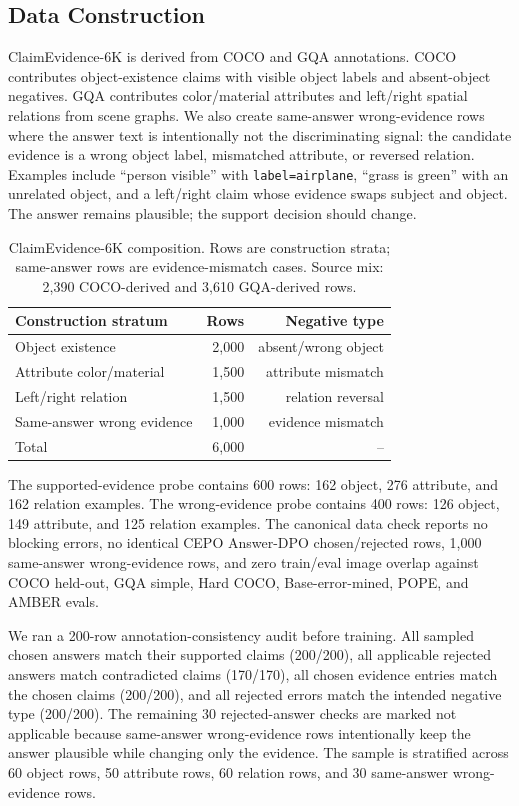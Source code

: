 \documentclass[10pt,twocolumn,letterpaper]{article}
\newcommand{\dataset}{ClaimEvidence-6K}
\newcommand{\answerdpo}{CEPO Answer-DPO}
\begin{document}
\subsection{Data Construction}

\dataset{} is derived from COCO and GQA annotations. COCO contributes
object-existence claims with visible object labels and absent-object negatives.
GQA contributes color/material attributes and left/right spatial relations
from scene graphs. We also create same-answer wrong-evidence rows where the
answer text is intentionally not the discriminating signal: the candidate
evidence is a wrong object label, mismatched attribute, or reversed relation.
Examples include ``person visible'' with \texttt{label=airplane}, ``grass is
green'' with an unrelated object, and a left/right claim whose evidence swaps
subject and object. The answer remains plausible; the support decision should
change.

\begin{table}[t]
\centering
\small
\setlength{\tabcolsep}{4pt}
\begin{tabular}{lrr}
\toprule
Construction stratum & Rows & Negative type \\
\midrule
Object existence & 2{,}000 & absent/wrong object \\
Attribute color/material & 1{,}500 & attribute mismatch \\
Left/right relation & 1{,}500 & relation reversal \\
Same-answer wrong evidence & 1{,}000 & evidence mismatch \\
\midrule
Total & 6{,}000 & -- \\
\bottomrule
\end{tabular}
\caption{\dataset{} composition. Rows are construction strata; same-answer
rows are evidence-mismatch cases. Source mix: 2{,}390 COCO-derived and
3{,}610 GQA-derived rows.}
\label{tab:data}
\end{table}

The supported-evidence probe contains 600 rows: 162 object, 276 attribute, and
162 relation examples. The wrong-evidence probe contains 400 rows: 126 object,
149 attribute, and 125 relation examples. The canonical data check reports no
blocking errors, no identical \answerdpo{} chosen/rejected rows, 1{,}000
same-answer wrong-evidence rows, and zero train/eval image overlap against
COCO held-out, GQA simple, Hard COCO, Base-error-mined, POPE, and AMBER evals.

We ran a 200-row annotation-consistency audit before training. All sampled
chosen answers match their supported claims (200/200), all applicable rejected
answers match contradicted claims (170/170), all chosen evidence entries match
the chosen claims (200/200), and all rejected errors match the intended
negative type (200/200). The remaining 30 rejected-answer checks are marked
not applicable because same-answer wrong-evidence rows intentionally keep the
answer plausible while changing only the evidence. The sample is stratified
across 60 object rows, 50 attribute rows, 60 relation rows, and 30
same-answer wrong-evidence rows.
\end{document}
